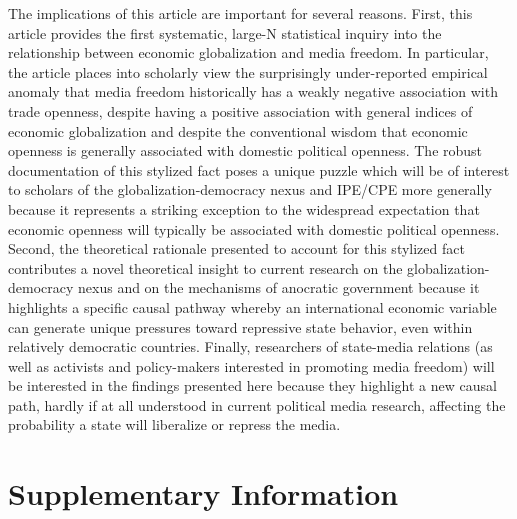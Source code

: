 \documentclass[12pt,a4paper]{article}\usepackage[]{graphicx}\usepackage[]{color}
\begin{document}
The implications of this article are important for several reasons. First, this article provides the first systematic, large-N statistical inquiry into the relationship between economic globalization and media freedom. In particular, the article places into scholarly view the surprisingly under-reported empirical anomaly that media freedom historically has a weakly negative association with trade openness, despite having a positive association with general indices of economic globalization and despite the conventional wisdom that economic openness is generally associated with domestic political openness. The robust documentation of this stylized fact poses a unique puzzle which will be of interest to scholars of the globalization-democracy nexus and IPE/CPE more generally because it represents a striking exception to the widespread expectation that economic openness will typically be associated with domestic political openness. Second, the theoretical rationale presented to account for this stylized fact contributes a novel theoretical insight to current research on the globalization-democracy nexus and on the mechanisms of anocratic government because it highlights a specific causal pathway whereby an international economic variable can generate unique pressures toward repressive state behavior, even within relatively democratic countries. Finally, researchers of state-media relations (as well as activists and policy-makers interested in promoting media freedom) will be interested in the findings presented here because they highlight a new causal path, hardly if at all understood in current political media research, affecting the probability a state will liberalize or repress the media.

\clearpage

\section{Supplementary Information}
\end{document}
